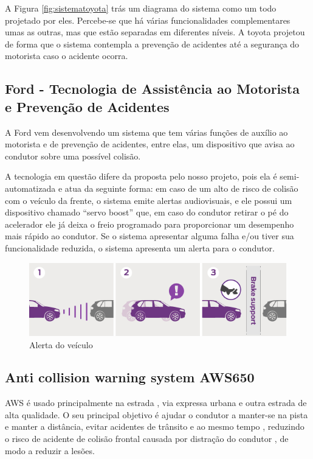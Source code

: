 A Figura \ref{fig:sistematoyota} trás um diagrama do sistema como um todo projetado por eles. Percebe-se que há várias funcionalidades complementares umas as outras, mas que estão separadas em diferentes níveis. A toyota projetou de forma que o sistema contempla a prevenção de acidentes até a segurança do motorista caso o acidente ocorra.

\subsection{Ford - Tecnologia de Assistência ao Motorista e Prevenção de Acidentes}
A Ford vem desenvolvendo um sistema que tem várias funções de auxílio ao motorista e de prevenção de acidentes, entre elas, um dispositivo que avisa ao condutor sobre uma possível colisão.

A tecnologia em questão difere da proposta pelo nosso projeto, pois ela é semi-automatizada e atua da seguinte forma: em caso de um alto de risco de colisão com o veículo da frente, o sistema emite alertas audiovisuais, e ele possui um dispositivo chamado “servo boost” que, em caso do condutor retirar o pé do acelerador ele já deixa o freio programado para proporcionar um desempenho mais rápido ao condutor. Se o sistema apresentar alguma falha e/ou tiver sua funcionalidade reduzida, o sistema apresenta um alerta para o condutor.

\begin{figure}[h]
  \centering
  \includegraphics[width=450px, scale=0.5]{figuras/sistemaford}
  \caption{Alerta do veículo}
  \label{fig:sistemaford}
\end{figure}

\subsection{Anti collision warning system AWS650}
AWS é usado principalmente na estrada , via expressa urbana e outra estrada de alta qualidade. O seu principal objetivo é ajudar o condutor a manter-se na pista e manter a distância, evitar acidentes de trânsito e ao mesmo tempo , reduzindo o risco de acidente de colisão frontal causada por distração do condutor , de modo a reduzir a lesões.

